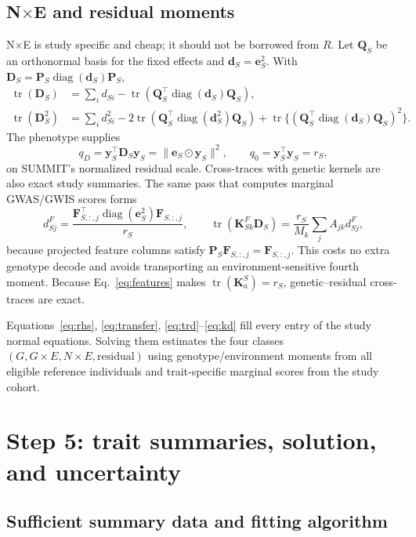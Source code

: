 \documentclass[11pt]{article}
\newcommand{\tr}{\operatorname{tr}}
\newcommand{\diag}{\operatorname{diag}}
\newcommand{\bP}{\bm P}
\newcommand{\bK}{\bm K}
\newcommand{\by}{\bm y}
\newcommand{\be}{\bm e}
\newcommand{\bD}{\bm D}
\begin{document}
\subsection{N$\times$E and residual moments}

N$\times$E is study specific and cheap; it should not be borrowed from $R$.
Let $\bm Q_S$ be an orthonormal basis for the fixed effects and
$\bm d_S=\be_S^2$.  With $\bD_S=\bP_S\diag(\bm d_S)\bP_S$,
\begin{align}
 \tr(\bD_S)
 &=\sum_i d_{Si}-\tr(\bm Q_S^\top\diag(\bm d_S)\bm Q_S),\label{eq:trd}\\
 \tr(\bD_S^2)
 &=\sum_i d_{Si}^2
 -2\tr(\bm Q_S^\top\diag(\bm d_S^2)\bm Q_S)
 +\tr\{(\bm Q_S^\top\diag(\bm d_S)\bm Q_S)^2\}.
 \label{eq:trd2}
\end{align}
The phenotype supplies
\begin{equation}
 q_D=\by_S^\top\bD_S\by_S=\|\be_S\odot\by_S\|^2,
 \qquad q_0=\by_S^\top\by_S=r_S,
\end{equation}
on SUMMIT's normalized residual scale.  Cross-traces with genetic kernels are
also exact study summaries.  The same pass that computes marginal GWAS/GWIS
scores forms
\begin{equation}
 d^F_{Sj}=\frac{\bm F_{S,:,j}^{\top}\diag(\be_S^2)
                    \bm F_{S,:,j}}{r_S},\qquad
 \tr(\bK^F_{Sk}\bD_S)=\frac{r_S}{M_k}\sum_j A_{jk}d^F_{Sj},
 \label{eq:kd}
\end{equation}
because projected feature columns satisfy
$\bP_S\bm F_{S,:,j}=\bm F_{S,:,j}$.  This costs no extra genotype decode and
avoids transporting an environment-sensitive fourth moment.  Because
Eq.~\eqref{eq:features} makes
$\tr(\bK^S_a)=r_S$, genetic--residual cross-traces are exact.

Equations~\eqref{eq:rhs}, \eqref{eq:transfer}, \eqref{eq:trd}--\eqref{eq:kd}
fill every entry of the study normal equations.  Solving them estimates the
four classes $(G,G\times E,N\times E,\text{residual})$ using genotype/environment
moments from all eligible reference individuals and trait-specific marginal
scores from the study cohort.

\section{Step 5: trait summaries, solution, and uncertainty}

\subsection{Sufficient summary data and fitting algorithm}
\end{document}
